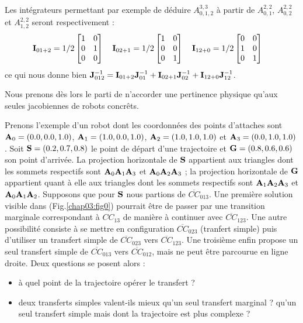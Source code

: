 Les int\'egrateurs permettant par exemple de d\'eduire $A^{3,3}_{0, 1, 2}$ \`a 
partir de $A^{2,2}_{0, 1}$, $A^{2,2}_{0, 2}$ et $A^{2,2}_{1,2}$ seront 
respectivement :
\begin{equation}
{\bf I}_{01+2} = 1/2
\begin{bmatrix}
1 & 0 \\
0 & 1 \\
0 & 0
\end{bmatrix}
\quad
{\bf I}_{02+1} = 1/2
\begin{bmatrix}
1 & 0 \\
0 & 0 \\
0 & 1
\end{bmatrix}
\quad
{\bf I}_{12+0} = 1/2
\begin{bmatrix}
0 & 0 \\
1 & 0 \\
0 & 1
\end{bmatrix}
\label{chap03:eq04} \quad
\end{equation}
ce qui nous donne bien ${\bf J}^{-1}_{012} = {\bf I}_{01+2} {\bf J}^{-1}_{01} + 
{\bf I}_{02+1} {\bf J}^{-1}_{02} + {\bf I}_{12+0} {\bf J}^{-1}_{12}$.

Nous prenons d\`es lors le parti de n'accorder une pertinence physique qu'aux 
seules jacobiennes de robots concr\^ets.

Prenons l'exemple d'un robot dont les coordonn\'ees des points d'attaches sont 
${\bf A}_0 = (0.0, 0.0, 1.0)$, ${\bf A}_1 = (1.0, 0.0, 1.0)$, ${\bf A}_2 = 
(1.0, 1.0, 1.0)$ et ${\bf A}_3 = (0.0, 1.0, 1.0)$. Soit ${\bf S} = (0.2, 0.7, 
0.8)$ le point de d\'epart d'une trajectoire et ${\bf G} = (0.8, 0.6, 0.6)$ son 
point d'arriv\'ee. La projection horizontale de ${\bf S}$ appartient aux 
triangles dont les sommets respectifs sont ${\bf A}_0{\bf A}_1{\bf A}_3$ et 
${\bf A}_0{\bf A}_2{\bf A}_3$ ; la projection horizontale de ${\bf G}$ 
appartient quant \`a elle aux triangles dont les sommets respectifs sont ${\bf 
A}_1{\bf A}_2{\bf A}_3$ et ${\bf A}_0{\bf A}_1{\bf A}_2$. Supposons que pour 
${\bf S}$ nous partions de $\overline{CC}_{013}$. Une premi\`ere solution 
visible  dans (Fig.\ref{chap03:fig0}) pourrait \^etre de passer par une 
transition marginale correspondant \`a $CC_{13}$ de mani\`ere \`a continuer 
avec $\overline{CC}_{123}$. Une autre possibilit\'e consiste \`a se mettre en 
configuration $\overline{CC}_{023}$ (tranfert simple) puis d'utiliser un 
transfert simple de $\overline{CC}_{023}$ vers $\overline{CC}_{123}$. Une 
troisi\`eme enfin propose un seul transfert simple de $\overline{CC}_{013}$ 
vers $\overline{CC}_{012}$, mais ne peut \^etre parcourue en ligne droite. Deux 
questions se posent alors :
\begin{itemize}
 \item \`a quel point de la trajectoire op\'erer le transfert ?
  \item  deux transferts simples valent-ils mieux qu'un seul transfert marginal 
? qu'un seul transfert simple mais dont la trajectoire est plus complexe ? 
\end{itemize}

